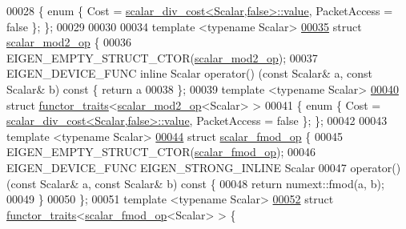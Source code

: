 \begin{DoxyCode}
00028 \{ \textcolor{keyword}{enum} \{ Cost = \hyperlink{struct_eigen_1_1internal_1_1scalar__div__cost}{scalar\_div\_cost<Scalar,false>::value}, PacketAccess = \textcolor{keyword}{
      false} \}; \};
00029 
00030 
00034 \textcolor{keyword}{template} <\textcolor{keyword}{typename} Scalar>
\hyperlink{struct_eigen_1_1internal_1_1scalar__mod2__op}{00035} \textcolor{keyword}{struct }\hyperlink{struct_eigen_1_1internal_1_1scalar__mod2__op}{scalar\_mod2\_op} \{
00036   EIGEN\_EMPTY\_STRUCT\_CTOR(\hyperlink{struct_eigen_1_1internal_1_1scalar__mod2__op}{scalar\_mod2\_op});
00037   EIGEN\_DEVICE\_FUNC \textcolor{keyword}{inline} Scalar operator() (\textcolor{keyword}{const} Scalar& a, \textcolor{keyword}{const} Scalar& b)\textcolor{keyword}{ const }\{ \textcolor{keywordflow}{return} a %
00038 \};
00039 \textcolor{keyword}{template} <\textcolor{keyword}{typename} Scalar>
\hyperlink{struct_eigen_1_1internal_1_1functor__traits_3_01scalar__mod2__op_3_01_scalar_01_4_01_4}{00040} \textcolor{keyword}{struct }\hyperlink{struct_eigen_1_1internal_1_1functor__traits}{functor\_traits}<\hyperlink{struct_eigen_1_1internal_1_1scalar__mod2__op}{scalar\_mod2\_op}<Scalar> >
00041 \{ \textcolor{keyword}{enum} \{ Cost = \hyperlink{struct_eigen_1_1internal_1_1scalar__div__cost}{scalar\_div\_cost<Scalar,false>::value}, PacketAccess = \textcolor{keyword}{
      false} \}; \};
00042 
00043 \textcolor{keyword}{template} <\textcolor{keyword}{typename} Scalar>
\hyperlink{struct_eigen_1_1internal_1_1scalar__fmod__op}{00044} \textcolor{keyword}{struct }\hyperlink{struct_eigen_1_1internal_1_1scalar__fmod__op}{scalar\_fmod\_op} \{
00045   EIGEN\_EMPTY\_STRUCT\_CTOR(\hyperlink{struct_eigen_1_1internal_1_1scalar__fmod__op}{scalar\_fmod\_op});
00046   EIGEN\_DEVICE\_FUNC EIGEN\_STRONG\_INLINE Scalar
00047   operator()(\textcolor{keyword}{const} Scalar& a, \textcolor{keyword}{const} Scalar& b)\textcolor{keyword}{ const }\{
00048     \textcolor{keywordflow}{return} numext::fmod(a, b);
00049   \}
00050 \};
00051 \textcolor{keyword}{template} <\textcolor{keyword}{typename} Scalar>
\hyperlink{struct_eigen_1_1internal_1_1functor__traits_3_01scalar__fmod__op_3_01_scalar_01_4_01_4}{00052} \textcolor{keyword}{struct }\hyperlink{struct_eigen_1_1internal_1_1functor__traits}{functor\_traits}<\hyperlink{struct_eigen_1_1internal_1_1scalar__fmod__op}{scalar\_fmod\_op}<Scalar> > \{

\end{DoxyCode}

